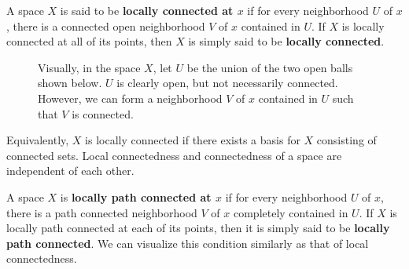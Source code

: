     \begin{definition}
      A space $X$ is said to be \textbf{locally connected at $x$} if for every neighborhood $U$ of $x$, there is a connected open neighborhood $V$ of $x$ contained in $U$. If $X$ is locally connected at all of its points, then $X$ is simply said to be \textbf{locally connected}. 

      \begin{figure}[H]
        \centering 
        \caption{Visually, in the space $X$, let $U$ be the union of the two open balls shown below. $U$ is clearly open, but not necessarily connected. However, we can form a  neighborhood $V$ of $x$ contained in $U$ such that $V$ is connected. }
        \label{fig:locally_connected}
      \end{figure}
    \end{definition}

    Equivalently, $X$ is locally connected if there exists a basis for $X$ consisting of connected sets. Local connectedness and connectedness of a space are independent of each other. 

    \begin{definition}
      A space $X$ is \textbf{locally path connected at $x$} if for every neighborhood $U$ of $x$, there is a path connected neighborhood $V$ of $x$ completely contained in $U$. If $X$ is locally path connected at each of its points, then it is simply said to be \textbf{locally path connected}. We can visualize this condition similarly as that of local connectedness. 
    \end{definition}

